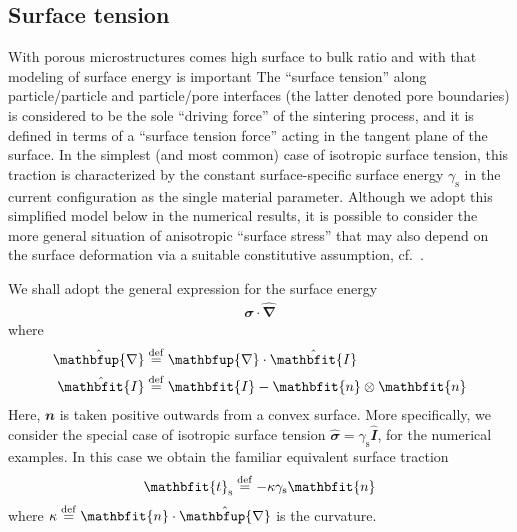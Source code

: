\documentclass[12pt,a4paper,fleqn]{article}
\renewcommand{\ta}[1]{\mathbfit{#1}}
\renewcommand{\ts}[1]{\mathbfit{#1}}
\renewcommand{\diff}{\mathbfup{\nabla}}
\newcommand{\figref}[1]{Figure~\ref{#1}}
\newcommand{\surf}{\mathrm{s}}
\begin{document}
%     


\subsection{Surface tension}

With porous microstructures comes high surface to bulk ratio and with that modeling of surface energy is important
The ``surface tension'' along particle/particle and particle/pore interfaces (the latter denoted pore boundaries) is considered to be the sole ``driving force'' of the sintering process, and it is defined in terms of a ``surface tension force'' acting in the tangent plane of the surface.
In the simplest (and most common) case of isotropic surface tension, this traction is characterized by the constant surface-specific surface energy $\gamma_\surf$ in the current configuration as the single material parameter.
Although we adopt this simplified model below in the numerical results, it is possible to consider the more general situation of anisotropic ``surface stress'' that may also depend on the surface deformation via a suitable constitutive assumption, cf.\ \cite{Steinmann2008:boundaryenergies}.

We shall adopt the general expression for the surface energy
\begin{align}
  \hat{\ts\sigma} \cdot \hat{\diff}
\label{eq:surface_energy}
\end{align}
where
\begin{align}
  \hat{\diff} &\defeq \diff \cdot \hat{\ts I}
\\
  \hat{\ts I} &\defeq  \ts I - \ta n \outerp \ta n
\end{align}
Here, $\ta{n}$ is taken positive outwards from a convex surface.
More specifically, we consider the special case of isotropic surface tension $\hat{\ts\sigma} = \gamma_\surf \hat{\ts I}$, for the numerical examples.
In this case we obtain the familiar equivalent surface traction
\begin{equation}
    \ta{t}_\surf\defeq -\kappa\gamma_\surf\ta{n}
\label{eq:surface_traction_strong}
\end{equation}
where $\kappa\defeq\ta{n}\cdot\hat{\diff}$ is the curvature.
\end{document}
